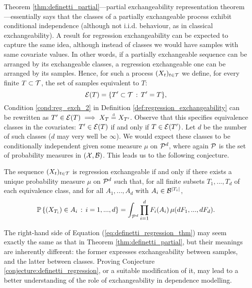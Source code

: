 Theorem \ref{thm:definetti_partial}---partial exchangeability representation theorem---essentially says that the classes of a partially exchangeable process exhibit conditional independence (although not i.i.d. behaviour, as in classical exchangeability). A result for regression exchangeability can be expected to capture the same idea, although instead of classes we would have samples with same covariate values. In other words, if a partially exchangeable sequence can be arranged by its exchangeable classes, a regression exchangeable one can be arranged by its samples. Hence, for such a process $(X_t)_{t \in \mathcal{T}}$ we define, for every finite $T \subset \mathcal{T}$, the set of samples equivalent to $T$:
\begin{equation*}
	\mathcal{E} (T) = \{ T' \subset \mathcal{T} \, : \, T' = T \},
\end{equation*}
Condition \ref{cond:reg_exch_2} in Definition \ref{def:regression_exchangeability} can be rewritten as $T' \in \mathcal{E}(T) \implies X_T \stackrel{\text{\rm\tiny d}}{=} X_{T'}$. Observe that this specifies equivalence classes in the covariates: $T' \in \mathcal{E} (T)$ if and only if $T \in \mathcal{E} (T')$. Let $d$ be the number of such classes ($d$ may very well be $\infty$). We would expect these classes to be conditionally independent given some measure $\mu$ on $\mathcal{P}^d$, where again $\mathcal{P}$ is the set of probability measures in $(\mathcal{X}, \mathcal{B})$. This leads us to the following conjecture.

\begin{conjecture} \label{conjecture:definetti_regression}
	The sequence $(X_t)_{t \in \mathcal{T}}$ is regression exchangeable if and only if there exists a unique probability measure $\mu$ on $\mathcal{P}^d$ such that, for all finite subsets $T_1, ..., T_d$ of each equivalence class, and for all $A_1, ..., A_d$ with $A_i \in \mathcal{B}^{|T_i|}$,
	\begin{equation} \label{eq:definetti_regression_thm}
		\mathbb{P} \left\{ (X_{T_i}) \in A_i \, : \, i=1, ..., d  \right\} = \int_{\mathcal{P}^d}  \prod_{i=1}^d F_i(A_i) \, \mu(dF_1, ..., dF_d).
	\end{equation}
\end{conjecture}

The right-hand side of Equation (\ref{eq:definetti_regression_thm}) may seem exactly the same as that in Theorem \ref{thm:definetti_partial}, but their meanings are inherently different: the former expresses exchangeability between samples, and the latter between classes. Proving Conjecture \ref{conjecture:definetti_regression}, or a suitable modification of it, may lead to a better understanding of the role of exchangeability in dependence modelling.

























